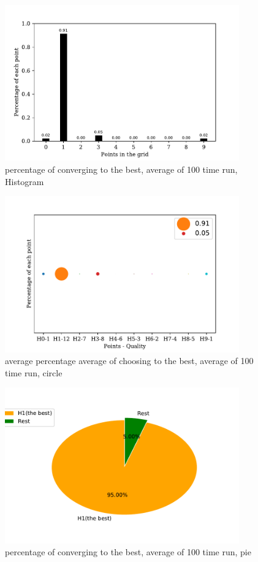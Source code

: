 \documentclass[a4paper,12pt]{article}
\begin{document}
	\begin{figure}[H]
		\centering
		\includegraphics[width=0.9\textwidth]{average_percentagenorm1_toss200_3000_100}
		\caption{percentage of converging to the best, average of 100 time run, Histogram}\label{average_percentagenorm1_toss200_3000_100}
	\end{figure}
	\begin{figure}[H]
		\centering
		\includegraphics[width=0.9\textwidth]{Average_percentagenorm1_toss200_3000_100_2}
		\caption{average percentage average of choosing to the best, average of 100 time run, circle}\label{Average_percentagenorm1_toss200_3000_100_2}
	\end{figure}
	\begin{figure}[H]
		\centering
		\includegraphics[width=0.9\textwidth]{average_percentagenorm1_toss200_3000_100_3}
		\caption{percentage of converging to the best, average of 100 time run, pie}\label{average_percentagenorm1_toss200_3000_100_3}
	\end{figure}
	
\end{document}
